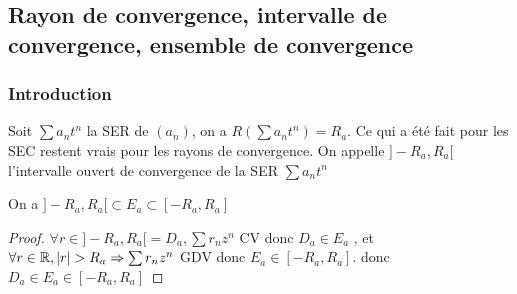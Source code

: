 \documentclass[11pt,hidelinks]{book}
\theoremstyle{mytheoremstyle}
\theoremstyle{mytheoremstyle}
\theoremstyle{mytheoremstyle}
\theoremstyle{mytheoremstyle}
\theoremstyle{mytheoremstyle}
\theoremstyle{mytheoremstyle}
\theoremstyle{mytheoremstyle}
\theoremstyle{mytheoremstyle}
\theoremstyle{myproblemstyle}
\def\mbb#1{\mathbb{#1}}
\def\bR{\mbb{R}}
\def\ser{\sum a_n t^n}
\def\seb#1{\sum #1_n z^n}
\newcommand{\parenth}[1]{\left(#1\right)}
\begin{document}
\subsection{Rayon de convergence, intervalle de convergence, ensemble de convergence}
\subsubsection{Introduction}
Soit $\ser$ la SER de $(a_n)$, on a $R\parenth{\ser} = R_a$.
Ce qui a été fait pour les SEC restent vrais pour les rayons de convergence.
On appelle $]-R_a, R_a[$ l'intervalle ouvert de convergence de la SER $\ser$

\begin{adjustwidth}{-2em}{-1em}
    \begin{prop}
        On a $]-R_a, R_a[ \subset E_a \subset [-R_a, R_a]$
        \begin{proof}
            $\forall r \in ]-R_a, R_a[ = D_a, \seb{r}$ CV donc $D_a \in E_a$ , et $\forall r \in \bR, \abs{r} > R_a \Rightarrow \seb{r}$ GDV
            donc $E_a \in [-R_a, R_a]$. 
            donc $D_a \in E_a \in [-R_a, R_a]$
        \end{proof}
    \end{prop}

\end{adjustwidth}
\end{document}
